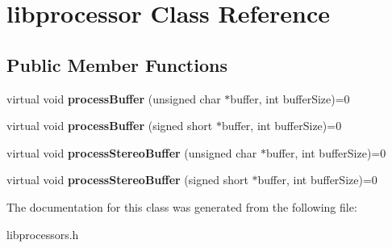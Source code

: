 \hypertarget{classlibprocessor}{}\section{libprocessor Class Reference}
\label{classlibprocessor}
\subsection*{Public Member Functions}
\begin{DoxyCompactItemize}
\item 
\mbox{\label{classlibprocessor_ac22855913d8d2ed6e23760382be25268}} 
virtual void {\bfseries process\+Buffer} (unsigned char $\ast$buffer, int buffer\+Size)=0
\item 
\mbox{\label{classlibprocessor_af4145468e45eabe4f0a7400a1d872832}} 
virtual void {\bfseries process\+Buffer} (signed short $\ast$buffer, int buffer\+Size)=0
\item 
\mbox{\label{classlibprocessor_aa93ae2a6e1fe55a6a610cd6cfdc85c5c}} 
virtual void {\bfseries process\+Stereo\+Buffer} (unsigned char $\ast$buffer, int buffer\+Size)=0
\item 
\mbox{\label{classlibprocessor_a509704575cda1d6cc317842d1f19bbeb}} 
virtual void {\bfseries process\+Stereo\+Buffer} (signed short $\ast$buffer, int buffer\+Size)=0
\end{DoxyCompactItemize}


The documentation for this class was generated from the following file\+:\begin{DoxyCompactItemize}
\item 
libprocessors.\+h\end{DoxyCompactItemize}
